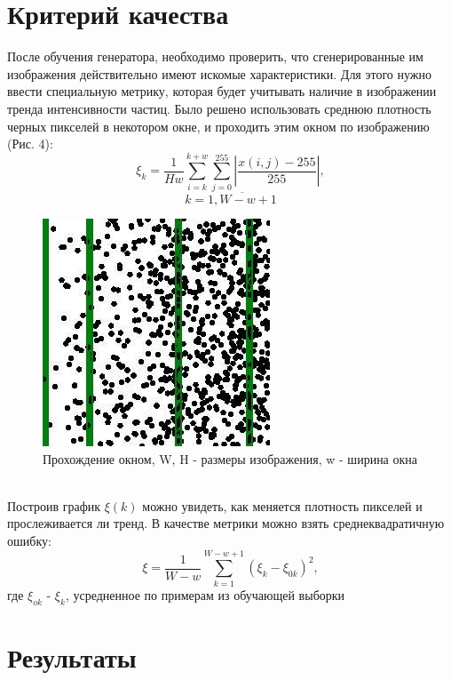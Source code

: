 \documentclass[a4paper]{article}
\begin{document}
	\section{Критерий качества}
		После обучения генератора, необходимо проверить, что сгенерированные им изображения действительно имеют искомые характеристики. Для этого нужно ввести специальную метрику, которая будет учитывать наличие в изображении тренда интенсивности частиц. Было решено использовать среднюю плотность черных пикселей в некотором окне, и проходить этим окном по изображению (Рис. 4):
		$$\xi_k = \frac{1}{H w}{\sum_{i=k}^{k+w} \sum_{j=0}^{255}\left| \frac{x(i, j) - 255}{255} \right|}, $$$$k = \overline{1, W - w + 1} $$
		\begin{figure}[h!]
			\begin{center}
				\includegraphics[width=0.35\linewidth]{metrics}
			\end{center}
			\caption{Прохождение окном, W, H - размеры изображения, w - ширина окна}
		\end{figure}
		\\
		Построив график $\xi(k)$ можно увидеть, как меняется плотность пикселей и прослеживается ли тренд. В качестве метрики можно взять среднеквадратичную ошибку:
		$$ \xi = \frac{1}{W-w}\sum_{k=1}^{W-w+1} (\xi_k - \xi_{0k})^2,$$
		где $\xi_{ok}$ - $\xi_k$, усредненное по примерам из обучающей выборки
	\section{Результаты}
\end{document}
